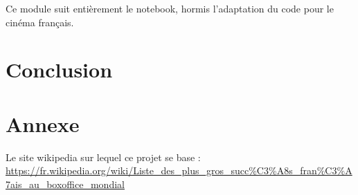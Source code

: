 \documentclass[11pt]{report}
\begin{document}
    Ce module suit entièrement le notebook, hormis l'adaptation du code pour le cinéma français.
 
    \chapter{Conclusion}
 
    \chapter{Annexe}
 
    Le site wikipedia sur lequel ce projet se base :
    \url{https://fr.wikipedia.org/wiki/Liste_des_plus_gros_succ\%C3\%A8s_fran\%C3\%A7ais_au_boxoffice_mondial}
 
\end{document}
